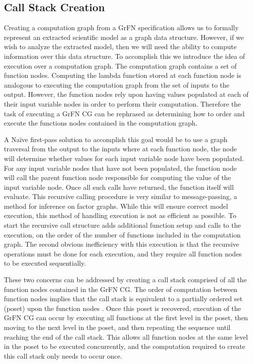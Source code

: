 \subsection{Call Stack Creation\label{sec:call_stack}}
Creating a computation graph from a GrFN specification allows us to formally represent an extracted scientific model as a graph data structure.
However, if we wish to analyze the extracted model, then we will need the ability to compute information over this data structure.
To accomplish this we introduce the idea of execution over a computation graph. The computation graph contains a set of function nodes.
Computing the lambda function stored at each function node is analogous to executing the computation graph from the set of inputs to the output.
However, the function nodes rely upon having values populated at each of their input variable nodes in order to perform their computation.
Therefore the task of executing a GrFN CG can be rephrased as determining how to order and execute the functions nodes contained in the computation graph.

A Naïve first-pass solution to accomplish this goal would be to use a graph traversal from the output to the inputs where at each function node, the node will determine whether values for each input variable node have been populated.
For any input variable nodes that have not been populated, the function node will call the parent function node responsible for computing the value of the input variable node.
Once all such calls have returned, the function itself will evaluate. This recursive calling procedure is very similar to message-passing, a method for inference on factor graphs.
While this will ensure correct model execution, this method of handling execution is not as efficient as possible.
To start the recursive call structure adds additional function setup and calls to the execution, on the order of the number of functions included in the computation graph.
The second obvious inefficiency with this execution is that the recursive operations must be done for each execution, and they require all function nodes to be executed sequentially.

These two concerns can be addressed by creating a call stack comprised of all the function nodes contained in the GrFN CG.
The order of computation between function nodes implies that the call stack is equivalent to a partially ordered set (poset) upon the function nodes \citep{simovici2008miningTools}.
Once this poset is recovered, execution of the GrFN CG can occur by executing all functions at the first level in the poset, then moving to the next level in the poset, and then repeating the sequence until reaching the end of the call stack.
This allows all function nodes at the same level in the poset to be executed concurrently, and the computation required to create this call stack only needs to occur once.

